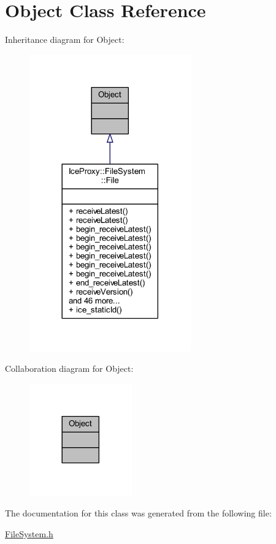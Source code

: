 \hypertarget{class_ice_proxy_1_1_ice_1_1_object}{}\section{Object Class Reference}
\label{class_ice_proxy_1_1_ice_1_1_object}


Inheritance diagram for Object\+:
\nopagebreak
\begin{figure}[H]
\begin{center}
\leavevmode
\includegraphics[width=197pt]{class_ice_proxy_1_1_ice_1_1_object__inherit__graph}
\end{center}
\end{figure}


Collaboration diagram for Object\+:
\nopagebreak
\begin{figure}[H]
\begin{center}
\leavevmode
\includegraphics[width=125pt]{class_ice_proxy_1_1_ice_1_1_object__coll__graph}
\end{center}
\end{figure}


The documentation for this class was generated from the following file\+:\begin{DoxyCompactItemize}
\item 
\hyperlink{_file_system_8h}{File\+System.\+h}\end{DoxyCompactItemize}
